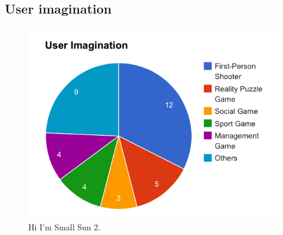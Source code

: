 \subsection{User imagination}

\begin{figure}[!t]
\centering
\includegraphics[width=0.9\columnwidth]{Figures/US1_userImaginationStatistics.png}
\caption{Hi I'm Small Sun 2.}
\label{fig:PS_Frus}
\end{figure}

